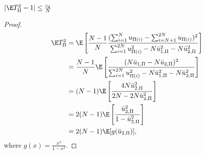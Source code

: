 \begin{proposition}
  $|\E T_{\Pi}^2 -1| \leq \frac{c_2}{N}$
\end{proposition}
\begin{proof}
  \begin{align}
    \E T_{\Pi}^2
    &= \E \left [\frac{N-1}{N} \frac{
        (\sum_{i=1}^N u_{\Pi(i)} - \sum_{i=N+1}^{2N}u_{\Pi(i)})^2}
      {\sum_{i=1}^{2N}u_{\Pi(i)}^2-N\bar{u}_{1,\Pi}^2-N\bar{u}_{2,\Pi}^2} \right ] \nonumber \\
    &= \frac{N-1}{N} \E \left [\frac{
        (N\bar{u}_{1,\Pi}-N\bar{u}_{2,\Pi})^2}
      {\sum_{i=1}^{2N}u_{\Pi(i)}^2-N\bar{u}_{1,\Pi}^2-N\bar{u}_{2,\Pi}^2} \right ] \nonumber \\
    &= (N-1)\E \left [\frac{
        4 N\bar{u}_{2,\Pi}^2}{2N-2N\bar{u}_{2,\Pi}^2} \right ] \nonumber \\
    &= 2(N-1)\E \left [\frac{
        \bar{u}_{2,\Pi}^2}{1-\bar{u}_{2,\Pi}^2} \right ] \nonumber \\
    &= 2(N-1) \E[g(\bar{u}_{2,\Pi})], \label{def:varT}
  \end{align}
  where $g(x) = \frac{x^2}{1-x^2}$. 


\end{proof}

